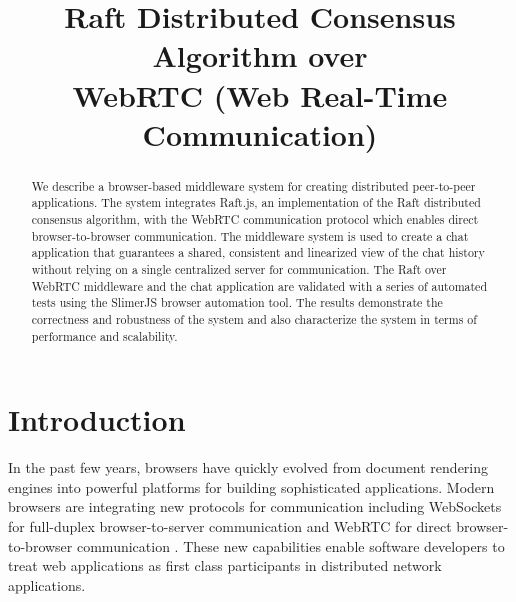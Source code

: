 \documentclass[conference,compsoc]{./IEEEtran/IEEEtran}
\begin{document}
\title{Raft Distributed Consensus Algorithm over\\ WebRTC (Web Real-Time Communication)}

\author{
\and
{}
}

\maketitle

\begin{abstract}
We describe a browser-based middleware system for
creating distributed peer-to-peer applications. The system integrates
Raft.js, an implementation of the Raft distributed consensus
algorithm, with the WebRTC communication protocol which enables direct
browser-to-browser communication. The middleware system is used to
create a chat application that guarantees a shared, consistent and
linearized view of the chat history without relying on a single
centralized server for communication. The Raft over WebRTC middleware
and the chat application are validated with a series of automated
tests using the SlimerJS browser automation tool. The results
demonstrate the correctness and robustness of the system and also
characterize the system in terms of performance and scalability.
\end{abstract}

\section{Introduction}
In the past few years, browsers have quickly evolved from document
rendering engines into powerful platforms for building sophisticated
applications. Modern browsers are integrating new protocols for
communication including WebSockets for full-duplex browser-to-server
communication \cite{websockets:rfc6455} and WebRTC for direct
browser-to-browser communication \cite{webrtc:feb2015}. These new
capabilities enable software developers to treat web applications as
first class participants in distributed network applications.
\end{document}
